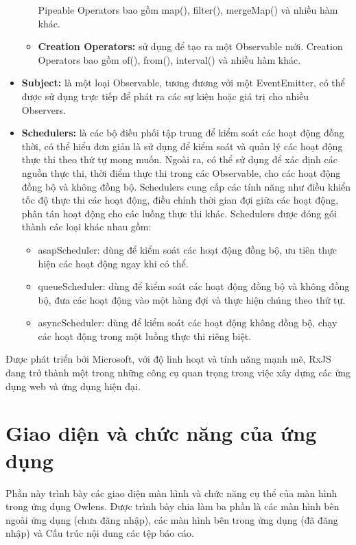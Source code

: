 \begin{itemize}
\begin{itemize}
                        Pipeable Operators bao gồm map(), filter(), mergeMap() và nhiều hàm khác.
                  \item \textbf{Creation Operators:} sử dụng để tạo ra một Observable mới.
                        Creation Operators bao gồm of(), from(), interval() và nhiều hàm khác.
            \end{itemize}
      \item \textbf{Subject:} là một loại Observable, tương đương với một EventEmitter, có thể được sử dụng trực tiếp để phát ra các sự kiện hoặc giá trị cho nhiều Observers.
      \item \textbf{Schedulers:} là các bộ điều phối tập trung để kiểm soát các hoạt động đồng thời, có thể hiểu đơn giản là sử dụng để kiểm soát và quản lý các hoạt động thực thi theo thứ tự mong muốn.
            Ngoài ra, có thể sử dụng để xác định các nguồn thực thi, thời điểm thực thi trong các Observable, cho các hoạt động đồng bộ và không đồng bộ.
            Schedulers cung cấp các tính năng như điều khiển tốc độ thực thi các hoạt động, điều chỉnh thời gian đợi giữa các hoạt động, phân tán hoạt động cho các luồng thực thi khác.
            Schedulers được đóng gói thành các loại khác nhau gồm:
            \begin{itemize}
                  \item asapScheduler: dùng để kiểm soát các hoạt động đồng bộ, ưu tiên thực hiện các hoạt động ngay khi có thể.
                  \item queueScheduler: dùng để kiểm soát các hoạt động đồng bộ và không đồng bộ, đưa các hoạt động vào một hàng đợi và thực hiện chúng theo thứ tự.
                  \item asyncScheduler: dùng để kiểm soát các hoạt động không đồng bộ, chạy các hoạt động trong một luồng thực thi riêng biệt.
            \end{itemize}
\end{itemize}

Được phát triển bởi Microsoft, với độ linh hoạt và tính năng mạnh mẽ, RxJS đang trở thành một trong những công cụ quan trọng trong việc xây dựng các ứng dụng web và ứng dụng hiện đại.

\newpage
\section{Giao diện và chức năng của ứng dụng}

\tab Phần này trình bày các giao diện màn hình và chức năng cụ thể của màn hình trong ứng dụng Owlens.
Được trình bày chia làm ba phần là các màn hình bên ngoài ứng dụng (chưa đăng nhập), các màn hình bên trong ứng dụng (đã đăng nhập) và Cấu trúc nội dung các tệp báo cáo.

